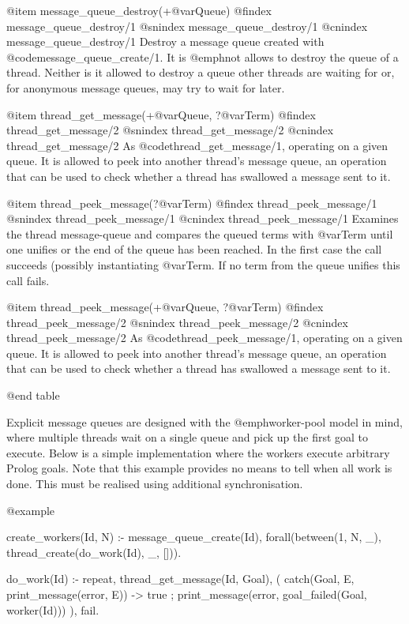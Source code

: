 {{{{{{{{@item message_queue_destroy(+@var{Queue})
@findex message_queue_destroy/1
@snindex message_queue_destroy/1
@cnindex message_queue_destroy/1
Destroy a message queue created with @code{message_queue_create/1}.  It is
@emph{not} allows to destroy the queue of a thread.  Neither is it
allowed to destroy a queue other threads are waiting for or, for
anonymous message queues, may try to wait for later.

@item thread_get_message(+@var{Queue}, ?@var{Term})
@findex thread_get_message/2
@snindex thread_get_message/2
@cnindex thread_get_message/2
As @code{thread_get_message/1}, operating on a given queue. It is allowed to
peek into another thread's message queue, an operation that can be used
to check whether a thread has swallowed a message sent to it.

@item thread_peek_message(?@var{Term})
@findex thread_peek_message/1
@snindex thread_peek_message/1
@cnindex thread_peek_message/1
Examines the thread message-queue and compares the queued terms
with @var{Term} until one unifies or the end of the queue has been
reached.  In the first case the call succeeds (possibly instantiating
@var{Term}.  If no term from the queue unifies this call fails.

@item thread_peek_message(+@var{Queue}, ?@var{Term})
@findex thread_peek_message/2
@snindex thread_peek_message/2
@cnindex thread_peek_message/2
As @code{thread_peek_message/1}, operating on a given queue. It is allowed to
peek into another thread's message queue, an operation that can be used
to check whether a thread has swallowed a message sent to it.

@end table


Explicit message queues are designed with the @emph{worker-pool} model
in mind, where multiple threads wait on a single queue and pick up the
first goal to execute.  Below is a simple implementation where the
workers execute arbitrary Prolog goals.  Note that this example provides
no means to tell when all work is done. This must be realised using
additional synchronisation.

@example
%	

create_workers(Id, N) :-
	message_queue_create(Id),
	forall(between(1, N, _),
	       thread_create(do_work(Id), _, [])).

do_work(Id) :-
	repeat,
	  thread_get_message(Id, Goal),
	  (   catch(Goal, E, print_message(error, E))
	  ->  true
	  ;   print_message(error, goal_failed(Goal, worker(Id)))
	  ),
	fail.

}}}}}}}}
